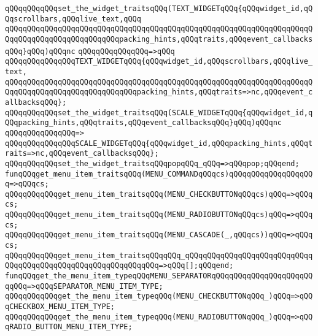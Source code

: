 \verb|qQQqqQQqqQQqset_the_widget_traitsqQQq(TEXT_WIDGETqQQq{qQQqwidget_id,qQQqscrollbars,qQQqlive_text,qQQq|\newline
\verb|qQQqqQQqqQQqqQQqqQQqqQQqqQQqqQQqqQQqqQQqqQQqqQQqqQQqqQQqqQQqqQQqqQQqqQQqqQQqqQQqqQQqqQQqqQQqqQQqpacking_hints,qQQqtraits,qQQqevent_callbacksqQQq}qQQq)qQQqnc|\newline
\verb|qQQqqQQqqQQqqQQq=>qQQq|\newline
\verb|qQQqqQQqqQQqqQQqTEXT_WIDGETqQQq{qQQqwidget_id,qQQqscrollbars,qQQqlive_text,|\newline
\verb|qQQqqQQqqQQqqQQqqQQqqQQqqQQqqQQqqQQqqQQqqQQqqQQqqQQqqQQqqQQqqQQqqQQqqQQqqQQqqQQqqQQqqQQqqQQqqQQqqQQqpacking_hints,qQQqtraits=>nc,qQQqevent_callbacksqQQq};|\newline
\verb|qQQqqQQqqQQqset_the_widget_traitsqQQq(SCALE_WIDGETqQQq{qQQqwidget_id,qQQqpacking_hints,qQQqtraits,qQQqevent_callbacksqQQq}qQQq)qQQqnc|\newline
\verb|qQQqqQQqqQQqqQQq=>|\newline
\verb|qQQqqQQqqQQqqQQqSCALE_WIDGETqQQq{qQQqwidget_id,qQQqpacking_hints,qQQqtraits=>nc,qQQqevent_callbacksqQQq};|\newline
\newline
\verb|qQQqqQQqqQQqset_the_widget_traitsqQQqpopqQQq_qQQq=>qQQqpop;qQQqend;|\newline
\newline
\verb|funqQQqget_menu_item_traitsqQQq(MENU_COMMANDqQQqcs)qQQqqQQqqQQqqQQqqQQq=>qQQqcs;|\newline
\verb|qQQqqQQqqQQqget_menu_item_traitsqQQq(MENU_CHECKBUTTONqQQqcs)qQQq=>qQQqcs;|\newline
\verb|qQQqqQQqqQQqget_menu_item_traitsqQQq(MENU_RADIOBUTTONqQQqcs)qQQq=>qQQqcs;|\newline
\verb|qQQqqQQqqQQqget_menu_item_traitsqQQq(MENU_CASCADE(_,qQQqcs))qQQq=>qQQqcs;|\newline
\verb|qQQqqQQqqQQqget_menu_item_traitsqQQqqQQq_qQQqqQQqqQQqqQQqqQQqqQQqqQQqqQQqqQQqqQQqqQQqqQQqqQQqqQQqqQQqqQQq=>qQQq[];qQQqend;|\newline
\newline
\verb|funqQQqget_the_menu_item_typeqQQqMENU_SEPARATORqQQqqQQqqQQqqQQqqQQqqQQqqQQq=>qQQqSEPARATOR_MENU_ITEM_TYPE;|\newline
\verb|qQQqqQQqqQQqget_the_menu_item_typeqQQq(MENU_CHECKBUTTONqQQq_)qQQq=>qQQqCHECKBOX_MENU_ITEM_TYPE;|\newline
\verb|qQQqqQQqqQQqget_the_menu_item_typeqQQq(MENU_RADIOBUTTONqQQq_)qQQq=>qQQqRADIO_BUTTON_MENU_ITEM_TYPE;|\newline

